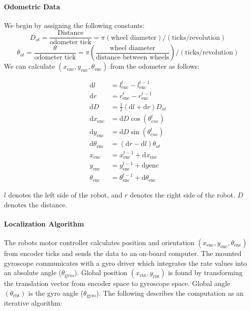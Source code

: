 \documentclass{article}
\begin{document}
\paragraph{Odometric Data}
We begin by assigning the following constants: 
\[D_{ot}=\frac{\text{Distance}}{\text{odometer tick}}=\pi(\text{wheel diameter})/(\text{ticks/revolution})\]\[ \theta_{ot} = \frac{\theta}{\text{odometer tick}} = \pi\left(\frac{\text{wheel diameter}}{\text{distance between wheels}}\right)/(\text{ticks/revolution})\]
We can calculate $(x_{\mathrm{enc}}, y_{\mathrm{enc}}, \theta_{\mathrm{enc}})$ from the odometer as follows: 
\begin{center}
	\begin{align*}
		\mathrm{d}l &= l^t_{\mathrm{enc}}-l^{t-1}_{\mathrm{enc}} \\
		\mathrm{d}r &= r^t_{\mathrm{enc}}-r^{t-1}_{\mathrm{enc}} \\
		\mathrm{d}D &= \frac{1}{2}(\mathrm{d}l+\mathrm{d}r)D_{ot} \\
		\mathrm{d}x_{\mathrm{enc}} &= \mathrm{d}D\cos(\theta^t_{enc}) \\
		\mathrm{d}y_{\mathrm{enc}} &= \mathrm{d}D\sin(\theta^t_{enc}) \\
		\mathrm{d}\theta_{\mathrm{enc}} &= (\mathrm{d}r-\mathrm{d}l)\theta_{ot} \\
		x_{\mathrm{enc}} &= x^{t-1}_{\mathrm{enc}} + \mathrm{d}x_{\mathrm{enc}} \\
		y_{\mathrm{enc}} &= y^{t-1}_{\mathrm{enc}} + \mathrm{d}y{\mathrm{enc}} \\
		\theta_{\mathrm{enc}} &= \theta^{t-1}_{\mathrm{enc}} + \mathrm{d}\theta_{\mathrm{enc}}
	\end{align*}
\end{center}

$l$ denotes the left side of the robot, and $r$ denotes the right side of the robot. $D$ denotes the distance. 

\paragraph{Localization Algorithm}
The robots motor controller calculates position and orientation $(x_{\mathrm{enc}}, y_{\mathrm{enc}}, \theta_{\mathrm{enc}})$ from encoder ticks and sends the data to an on-board computer. The mounted gyroscope communicates with a gyro driver which integrates the rate values into an absolute angle ($\theta_{\mathrm{gyro}}$). Global position $(x_{\mathrm{rbt}}, y_{\mathrm{rbt}})$ is found by transforming the translation vector from encoder space to gyroscope space. Global angle $(\theta_{\mathrm{rbt}})$ is the gyro angle ($\theta_{\mathrm{gyro}}$). The following describes the computation as an iterative algorithm: 
\end{document}

